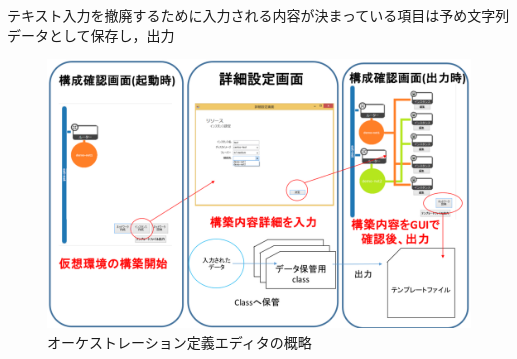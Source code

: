 \documentclass[a4j]{jarticle}
\begin{document}
\begin{Abstract}
 
 テキスト入力を撤廃するために入力される内容が決まっている項目は予め文字列データとして保存し，出力
 \begin{figure}[H]
 	\begin{center}
 		\vspace{-2mm}
 		\includegraphics[scale=0.26]{Document/GUIEditorOverview.eps}
 		\caption{オーケストレーション定義エディタの概略}
 		\label{graf:1}
 	\end{center}
 \end{figure}
 

\end{Abstract}
\end{document}
